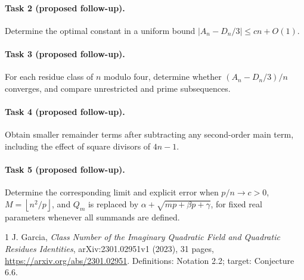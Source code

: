 \documentclass[11pt]{article}
\newcommand{\fl}[1]{\left\lfloor #1\right\rfloor}
\begin{document}
\paragraph{Task 2 (proposed follow-up).}
Determine the optimal constant in a uniform bound
\(\lvert A_n-D_n/3\rvert\le c n+O(1)\).

\paragraph{Task 3 (proposed follow-up).}
For each residue class of \(n\) modulo four, determine whether
\((A_n-D_n/3)/n\) converges, and compare unrestricted and prime subsequences.

\paragraph{Task 4 (proposed follow-up).}
Obtain smaller remainder terms after subtracting any second-order main
term, including the effect of square divisors of \(4n-1\).

\paragraph{Task 5 (proposed follow-up).}
Determine the corresponding limit and explicit error when
\(p/n\to c>0\), \(M=\fl{n^2/p}\), and \(Q_m\) is replaced by
\(\alpha+\sqrt{mp+\beta p+\gamma}\), for fixed real parameters whenever
all summands are defined.

\begin{thebibliography}{1}
J. Garcia, \emph{Class Number of the Imaginary Quadratic Field and
Quadratic Residues Identities}, arXiv:2301.02951v1 (2023), 31 pages,
\url{https://arxiv.org/abs/2301.02951}.
Definitions: Notation 2.2; target: Conjecture 6.6.
\end{thebibliography}
\end{document}
